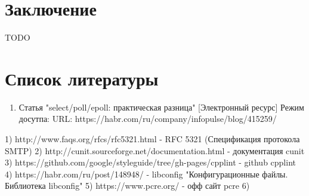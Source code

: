 \documentclass[a4paper,12pt]{report}
\begin{document}
\clearpage
\chapter*{Заключение}

TODO

\newpage
\chapter*{Список литературы}

\begin{enumerate}
	\item Статья "select/poll/epoll: практическая разница" [Электронный ресурс] Режим досутпа: URL: https://habr.com/ru/company/infopulse/blog/415259/
	
\end{enumerate}

1) http://www.faqs.org/rfcs/rfc5321.html - RFC 5321 (Спецификация протокола SMTP)
2) http://cunit.sourceforge.net/documentation.html - документация cunit 
3) https://github.com/google/styleguide/tree/gh-pages/cpplint - github cpplint
4) https://habr.com/ru/post/148948/ - libconfig "Конфигурационные файлы. Библиотека libconfig"
5) https://www.pcre.org/ - офф сайт pcre 
6) 
\end{document}
